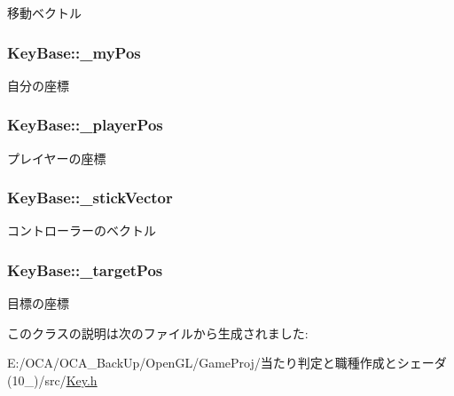 移動ベクトル 

\hypertarget{class_key_base_ac312d80c808d22c6c1c1be897b317b3a}{
\subsubsection[{\-\_\-my\-Pos}]{ Key\-Base\-::\-\_\-my\-Pos\hspace{0.3cm}{\ttfamily [protected]}}}\label{class_key_base_ac312d80c808d22c6c1c1be897b317b3a}


自分の座標 

\hypertarget{class_key_base_ac2598de02ad18e04b6f2bc929ee56e98}{
\subsubsection[{\-\_\-player\-Pos}]{ Key\-Base\-::\-\_\-player\-Pos\hspace{0.3cm}{\ttfamily [protected]}}}\label{class_key_base_ac2598de02ad18e04b6f2bc929ee56e98}


プレイヤーの座標 

\hypertarget{class_key_base_a774649bfb09128dcbe4617c11c448e25}{
\subsubsection[{\-\_\-stick\-Vector}]{ Key\-Base\-::\-\_\-stick\-Vector\hspace{0.3cm}{\ttfamily [protected]}}}\label{class_key_base_a774649bfb09128dcbe4617c11c448e25}


コントローラーのベクトル 

\hypertarget{class_key_base_ad76a22072f7fcdaa7b1900971a67207c}{
\subsubsection[{\-\_\-target\-Pos}]{ Key\-Base\-::\-\_\-target\-Pos\hspace{0.3cm}{\ttfamily [protected]}}}\label{class_key_base_ad76a22072f7fcdaa7b1900971a67207c}


目標の座標 



このクラスの説明は次のファイルから生成されました\-:\begin{DoxyCompactItemize}
\item 
E\-:/\-O\-C\-A/\-O\-C\-A\-\_\-\-Back\-Up/\-Open\-G\-L/\-Game\-Proj/当たり判定と職種作成とシェーダ(10\-\_)/src/\hyperlink{_key_8h}{Key.\-h}\end{DoxyCompactItemize}
